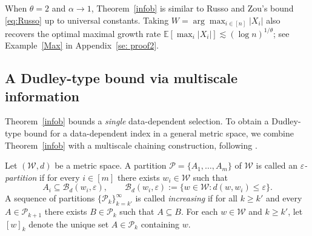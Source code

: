 \documentclass[11pt]{article}
\begin{document}
When $\theta=2$ and $\alpha\to 1$, Theorem~\ref{infob} is similar to Russo and Zou's bound
\eqref{eq:Russo} up to universal constants.  Taking $W=\arg\max_{i\in[n]}|X_i|$
also recovers the optimal maximal growth rate
$\mathbb{E}[\max_i|X_i|]\lesssim(\log n)^{1/\theta}$; see Example~\ref{Max} in
Appendix~\ref{se: proof2}.

\subsection{A Dudley-type bound via multiscale information}

Theorem~\ref{infob} bounds a \emph{single} data-dependent selection.  To obtain a
Dudley-type bound for a data-dependent index in a general metric space, we
combine Theorem~\ref{infob} with a multiscale chaining construction, following
\citet{asadi2018chaining,hellstrom2025generalization}.

\begin{definition}\label{def:part}
Let $(\mathcal{W},d)$ be a metric space. A partition $\mathcal{P}=\{A_1,\ldots,A_m\}$ of $\mathcal{W}$ is called an \emph{$\varepsilon$-partition} if for every $i\in[m]$ there exists $w_i\in\mathcal{W}$ such that
\[
A_i \subseteq \mathcal{B}_d(w_i,\varepsilon),
\qquad
\mathcal{B}_d(w_i,\varepsilon):=\{w\in\mathcal{W}: d(w,w_i)\le \varepsilon\}.
\]
A sequence of partitions $\{\mathcal{P}_k\}_{k=k'}^{\infty}$ is called \emph{increasing} if for all $k\ge k'$ and every $A\in\mathcal{P}_{k+1}$ there exists $B\in\mathcal{P}_k$ such that $A\subseteq B$. For each $w\in\mathcal{W}$ and $k\ge k'$, let $[w]_k$ denote the unique set $A\in\mathcal{P}_k$ containing $w$.
\end{definition}

\end{document}
